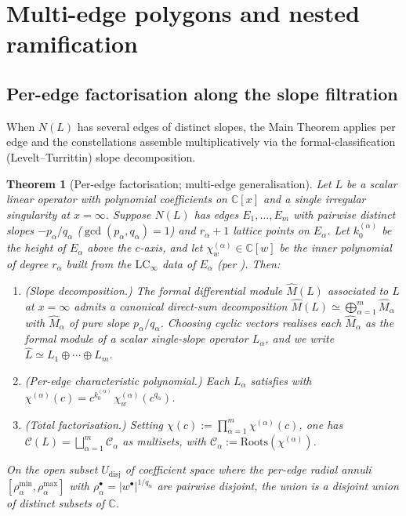 \documentclass[11pt,a4paper]{article}
\theoremstyle{plain}
\newtheorem{theorem}{Theorem}[section]
\theoremstyle{definition}
\theoremstyle{remark}
\newcommand{\LCinf}{\mathrm{LC}_\infty}
\newcommand{\Roots}{\mathrm{Roots}}
\newcommand{\NL}{N(L)}
\newcommand{\Cl}{\mathcal{C}}
\begin{document}
\section{Multi-edge polygons and nested ramification}\label{sec:multiedge}

\subsection{Per-edge factorisation along the slope filtration}\label{ssec:M1}

When $N(L)$ has several edges of distinct slopes, the Main Theorem applies
per edge and the constellations assemble multiplicatively via the
formal-classification (Levelt--Turrittin) slope decomposition.

\begin{theorem}[Per-edge factorisation; multi-edge generalisation]\label{thm:M1}
Let $L$ be a scalar linear operator with polynomial coefficients on
$\mathbb{C}[x]$ and a single irregular singularity at $x = \infty$. Suppose
$\NL$ has edges $E_1, \dots, E_m$ with pairwise distinct slopes
$-p_\alpha / q_\alpha$ ($\gcd(p_\alpha, q_\alpha) = 1$) and $r_\alpha + 1$
lattice points on $E_\alpha$. Let $k_0^{(\alpha)}$ be the height of $E_\alpha$
above the $c$-axis, and let $\chi_w^{(\alpha)} \in \mathbb{C}[w]$ be the
inner polynomial of degree $r_\alpha$ built from the $\LCinf$ data of
$E_\alpha$ (per ). Then:
\begin{enumerate}[leftmargin=2em]
\item (Slope decomposition.) The formal differential module
      $\widehat{M}(L)$ associated to $L$ at $x = \infty$ admits a canonical
      direct-sum decomposition $\widehat{M}(L) \simeq \bigoplus_{\alpha=1}^{m}
      \widehat{M}_\alpha$ with $\widehat{M}_\alpha$ of pure slope
      $p_\alpha / q_\alpha$. Choosing cyclic vectors realises each
      $\widehat{M}_\alpha$ as the formal module of a scalar single-slope
      operator $L_\alpha$, and we write
      $\widehat{L} \simeq L_1 \oplus \cdots \oplus L_m$.
\item (Per-edge characteristic polynomial.) Each $L_\alpha$ satisfies
       with
      $\chi^{(\alpha)}(c) = c^{k_0^{(\alpha)}}\, \chi_w^{(\alpha)}(c^{q_\alpha})$.
\item (Total factorisation.) Setting $\chi(c) := \prod_{\alpha=1}^{m}
      \chi^{(\alpha)}(c)$, one has
      $\Cl(L) = \bigsqcup_{\alpha=1}^{m} \Cl_\alpha$ as multisets, with
      $\Cl_\alpha := \Roots(\chi^{(\alpha)})$.
\end{enumerate}
On the open subset $U_{\mathrm{disj}}$ of coefficient space where the
per-edge radial annuli $[\rho_\alpha^{\min}, \rho_\alpha^{\max}]$ with
$\rho_\alpha^{\bullet} = |w^\bullet|^{1/q_\alpha}$ are pairwise disjoint,
the union is a disjoint union of \emph{distinct} subsets of $\mathbb{C}$.
\end{theorem}
\end{document}
